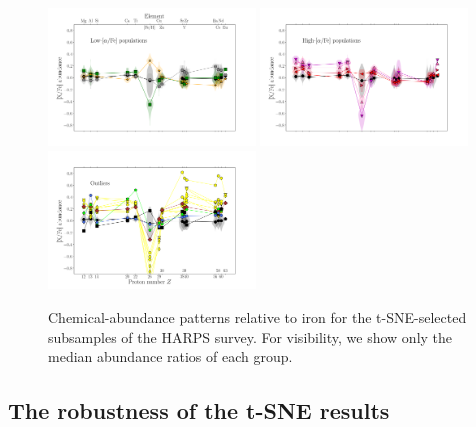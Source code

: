\documentclass{aa}  %
\begin{document}
\begin{figure}\centering
 \includegraphics[trim=0cm 2cm 0cm 0cm, clip=true, width=0.49\textwidth]{im/harps_tsne_abundances-relto-Fe_thin.png}
 \includegraphics[trim=0cm 2cm 0cm 2cm, clip=true, width=0.49\textwidth]{im/harps_tsne_abundances-relto-Fe_thick.png}
 \includegraphics[trim=0cm 0 0cm 2cm, clip=true, width=0.49\textwidth]{im/harps_tsne_abundances-relto-Fe_strange.png}
\caption{Chemical-abundance patterns relative to iron for the t-SNE-selected subsamples of the HARPS survey. For visibility, we show only the median abundance ratios of each group.}
\label{harps3}
\end{figure}

\subsection{The robustness of the t-SNE results}
\end{document}
